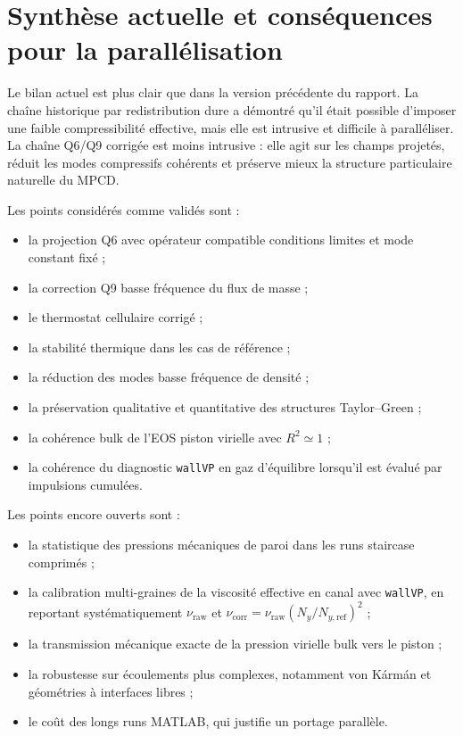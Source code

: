 \documentclass[11pt,a4paper]{article}
\begin{document}
\section{Synthèse actuelle et conséquences pour la parallélisation}

Le bilan actuel est plus clair que dans la version précédente du rapport. La chaîne historique par redistribution dure a démontré qu'il était possible d'imposer une faible compressibilité effective, mais elle est intrusive et difficile à paralléliser. La chaîne Q6/Q9 corrigée est moins intrusive : elle agit sur les champs projetés, réduit les modes compressifs cohérents et préserve mieux la structure particulaire naturelle du MPCD.

Les points considérés comme validés sont :
\begin{itemize}
  \item la projection Q6 avec opérateur compatible conditions limites et mode constant fixé ;
  \item la correction Q9 basse fréquence du flux de masse ;
  \item le thermostat cellulaire corrigé ;
  \item la stabilité thermique dans les cas de référence ;
  \item la réduction des modes basse fréquence de densité ;
  \item la préservation qualitative et quantitative des structures Taylor--Green ;
  \item la cohérence bulk de l'EOS piston virielle avec \(R^2\simeq1\) ;
  \item la cohérence du diagnostic \texttt{wallVP} en gaz d'équilibre lorsqu'il est évalué par impulsions cumulées.
\end{itemize}

Les points encore ouverts sont :
\begin{itemize}
  \item la statistique des pressions mécaniques de paroi dans les runs staircase comprimés ;
  \item la calibration multi-graines de la viscosité effective en canal avec \texttt{wallVP}, en reportant systématiquement \(\nu_{\mathrm{raw}}\) et \(\nu_{\mathrm{corr}}=\nu_{\mathrm{raw}}(N_y/N_{y,\mathrm{ref}})^2\) ;
  \item la transmission mécanique exacte de la pression virielle bulk vers le piston ;
  \item la robustesse sur écoulements plus complexes, notamment von Kármán et géométries à interfaces libres ;
  \item le coût des longs runs MATLAB, qui justifie un portage parallèle.
\end{itemize}
\end{document}
